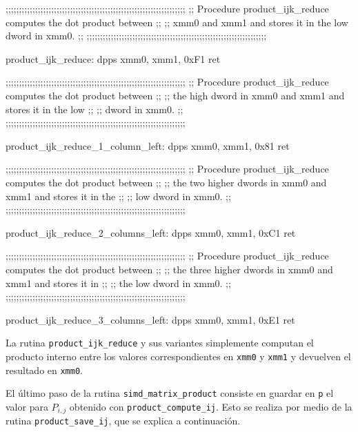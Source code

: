 \documentclass[a4paper, 10pt, twoside]{article}
\newcommand{\cc}[1]{\texttt{#1}}
\begin{document}
\begin{code}
  ;;;;;;;;;;;;;;;;;;;;;;;;;;;;;;;;;;;;;;;;;;;;;;;;;;;;;;;;;;;;;;;;;;;
  ;; Procedure product_ijk_reduce computes the dot product between ;;
  ;; xmm0 and xmm1 and stores it in the low dword in xmm0.         ;;
  ;;;;;;;;;;;;;;;;;;;;;;;;;;;;;;;;;;;;;;;;;;;;;;;;;;;;;;;;;;;;;;;;;;;

  product_ijk_reduce:
    dpps xmm0, xmm1, 0xF1
    ret

  ;;;;;;;;;;;;;;;;;;;;;;;;;;;;;;;;;;;;;;;;;;;;;;;;;;;;;;;;;;;;;;;;;;;
  ;; Procedure product_ijk_reduce computes the dot product between ;;
  ;; the high dword in  xmm0 and xmm1 and stores it in the low     ;;
  ;; dword in xmm0.                                                ;;
  ;;;;;;;;;;;;;;;;;;;;;;;;;;;;;;;;;;;;;;;;;;;;;;;;;;;;;;;;;;;;;;;;;;;

  product_ijk_reduce_1_column_left:
    dpps xmm0, xmm1, 0x81
    ret

  ;;;;;;;;;;;;;;;;;;;;;;;;;;;;;;;;;;;;;;;;;;;;;;;;;;;;;;;;;;;;;;;;;;;
  ;; Procedure product_ijk_reduce computes the dot product between ;;
  ;; the two higher dwords in  xmm0 and xmm1 and stores it in the  ;;
  ;; low dword in xmm0.                                            ;;
  ;;;;;;;;;;;;;;;;;;;;;;;;;;;;;;;;;;;;;;;;;;;;;;;;;;;;;;;;;;;;;;;;;;;

  product_ijk_reduce_2_columns_left:
    dpps xmm0, xmm1, 0xC1
    ret

  ;;;;;;;;;;;;;;;;;;;;;;;;;;;;;;;;;;;;;;;;;;;;;;;;;;;;;;;;;;;;;;;;;;;
  ;; Procedure product_ijk_reduce computes the dot product between ;;
  ;; the three higher dwords in  xmm0 and xmm1 and stores it in    ;;
  ;; the low dword in xmm0.                                        ;;
  ;;;;;;;;;;;;;;;;;;;;;;;;;;;;;;;;;;;;;;;;;;;;;;;;;;;;;;;;;;;;;;;;;;;

  product_ijk_reduce_3_columns_left:
    dpps xmm0, xmm1, 0xE1
    ret
\end{code}

La rutina \cc{product\_ijk\_reduce} y sus variantes simplemente computan el
producto interno entre los valores correspondientes en \cc{xmm0} y \cc{xmm1} y
devuelven el resultado en \cc{xmm0}.

El último paso de la rutina \cc{simd\_matrix\_product} consiste en guardar en
\cc{p} el valor para $P_{i,j}$ obtenido con \cc{product\_compute\_ij}. Esto se
realiza por medio de la rutina \cc{product\_save\_ij}, que se explica a
continuación.
\end{document}
